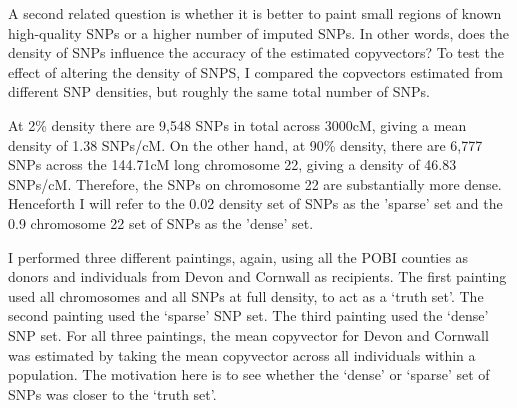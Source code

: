 A second related question is whether it is better to paint small regions of known high-quality SNPs or a higher number of imputed SNPs. In other words, does the density of SNPs influence the accuracy of the estimated copyvectors? To test the effect of altering the density of SNPS, I compared the copvectors estimated from different SNP densities, but roughly the same total number of SNPs. 

At 2\% density there are 9,548 SNPs in total across 3000cM, giving a mean density of 1.38 SNPs/cM. On the other hand, at 90\% density, there are 6,777 SNPs across the 144.71cM long chromosome 22, giving a density of 46.83 SNPs/cM. Therefore, the SNPs on chromosome 22 are substantially more dense. Henceforth I will refer to the 0.02 density set of SNPs as the 'sparse' set and the 0.9 chromosome 22 set of SNPs as the 'dense' set. 

I performed three different paintings, again, using all the POBI counties as donors and individuals from Devon and Cornwall as recipients. The first painting used all chromosomes and all SNPs at full density, to act as a `truth set'. The second painting used the `sparse' SNP set. The third painting used the `dense' SNP set. For all three paintings, the mean copyvector for Devon and Cornwall was estimated by taking the mean copyvector across all individuals within a population. The motivation here is to see whether the `dense' or `sparse' set of SNPs was closer to the `truth set'.  

